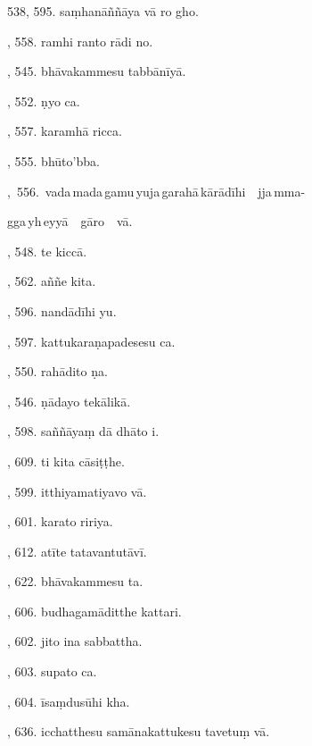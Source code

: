 538, 595. saṃhanāññāya vā ro gho.\hfill \pageref{sut:538}\par {}, 558. ramhi ranto rādi no.\hfill \pageref{sut:539}\par {}, 545. bhāvakammesu tabbānīyā.\hfill \pageref{sut:540}\par {}, 552. ṇyo ca.\hfill \pageref{sut:541}\par {}, 557. karamhā ricca.\hfill \pageref{sut:542}\par {}, 555. bhūto’bba.\hfill \pageref{sut:543}\par {},~556.~vada\,mada\,gamu\,yuja\,garahā\,kārādīhi\ \ jja\,mma-\par \noindent
\hspace{15mm} gga\,yh\,eyyā\ \ gāro\ \ vā.\hfill \pageref{sut:544}\par {}, 548. te kiccā.\hfill \pageref{sut:545}\par {}, 562. aññe kita.\hfill \pageref{sut:546}\par {}, 596. nandādīhi yu.\hfill \pageref{sut:547}\par {}, 597. kattukaraṇapadesesu ca.\hfill \pageref{sut:548}\par {}, 550. rahādito ṇa.\hfill \pageref{sut:549}\par {}, 546. ṇādayo tekālikā.\hfill \pageref{sut:550}\par {}, 598. saññāyaṃ dā dhāto i.\hfill \pageref{sut:551}\par {}, 609. ti kita cāsiṭṭhe.\hfill \pageref{sut:552}\par {}, 599. itthiyamatiyavo vā.\hfill \pageref{sut:553}\par {}, 601. karato ririya.\hfill \pageref{sut:554}\par {}, 612. atīte tatavantutāvī.\hfill \pageref{sut:555}\par {}, 622. bhāvakammesu ta.\hfill \pageref{sut:556}\par {}, 606. budhagamāditthe kattari.\hfill \pageref{sut:557}\par {}, 602. jito ina sabbattha.\hfill \pageref{sut:558}\par {}, 603. supato ca.\hfill \pageref{sut:559}\par {}, 604. īsaṃdusūhi kha.\hfill \pageref{sut:560}\par {}, 636. icchatthesu samānakattukesu tavetuṃ vā.\hfill \pageref{sut:561}\par \noindent

